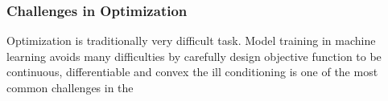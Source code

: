 \subsubsection{Challenges in Optimization}

Optimization is traditionally very difficult task. Model training in machine learning avoids many difficulties by carefully design objective function to be continuous, differentiable and convex
the ill conditioning is one of the most common challenges in the 